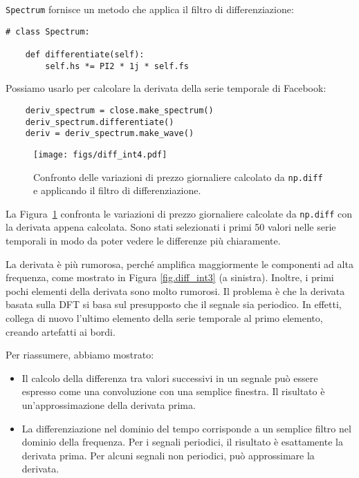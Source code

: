 \documentclass[12pt,a4paper]{book}
\begin{document}
{\tt Spectrum} fornisce un metodo che applica il filtro di differenziazione:

\begin{verbatim} 
# class Spectrum:

    def differentiate(self):
        self.hs *= PI2 * 1j * self.fs
 \end{verbatim} 

Possiamo usarlo per calcolare la derivata della serie temporale di Facebook:

\begin{verbatim} 
    deriv_spectrum = close.make_spectrum()
    deriv_spectrum.differentiate()
    deriv = deriv_spectrum.make_wave()
 \end{verbatim} 

\begin{figure} 

\centerline{\texttt{[image: figs/diff\_int4.pdf]}} \caption{Confronto delle variazioni di prezzo giornaliere calcolato da {\tt np.diff} e applicando il filtro di differenziazione.} \label{fig.diff_int4} \end{figure} 

La Figura~\ref{fig.diff_int4} confronta le variazioni di prezzo giornaliere calcolate da {\tt np.diff} con la derivata appena calcolata. Sono stati selezionati i primi 50 valori nelle serie temporali in modo da poter vedere le differenze più chiaramente.

La derivata è più rumorosa, perché amplifica maggiormente le componenti ad alta frequenza, come mostrato in Figura \ref{fig.diff_int3} (a sinistra). Inoltre, i primi pochi elementi della derivata sono molto rumorosi. Il problema è che la derivata basata sulla DFT si basa sul presupposto che il segnale sia periodico. In effetti, collega di nuovo l'ultimo elemento della serie temporale al primo elemento, creando artefatti ai bordi.

Per riassumere, abbiamo mostrato:

\begin{itemize} 

\item Il calcolo della differenza tra valori successivi in un segnale può essere espresso come una convoluzione con una semplice finestra. Il risultato è un'approssimazione della derivata prima.

\item La differenziazione nel dominio del tempo corrisponde a un semplice filtro nel dominio della frequenza. Per i segnali periodici, il risultato è esattamente la derivata prima. Per alcuni segnali non periodici, può approssimare la derivata.

\end{itemize} 
\end{document}
